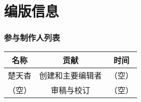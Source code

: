 \section*{编版信息}
\subsubsection*{参与制作人列表}

\begin{table}[h]

\begin{tabular}{c|cc}
\hline
\textbf{名称}&\textbf{贡献}&\textbf{时间}\\
\hline
楚天杳&创建和主要编辑者&（空）\\
（空）&审稿与校订&（空）\\
\hline
\end{tabular}

\end{table}
